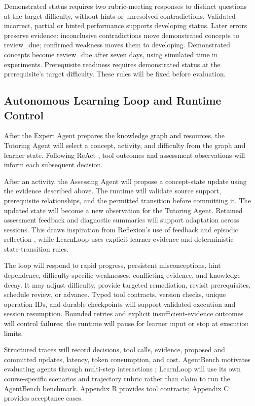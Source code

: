 \documentclass{article}
\begin{document}
Demonstrated status requires two rubric-meeting responses to distinct questions at the target difficulty, without hints or unresolved contradictions. Validated incorrect, partial or hinted performance supports developing status. Later errors preserve evidence: inconclusive contradictions move demonstrated concepts to review\_due; confirmed weakness moves them to developing. Demonstrated concepts become review\_due after seven days, using simulated time in experiments. Prerequisite readiness requires demonstrated status at the prerequisite's target difficulty. These rules will be fixed before evaluation.

\subsection{Autonomous Learning Loop and Runtime Control}

After the Expert Agent prepares the knowledge graph and resources, the Tutoring Agent will select a concept, activity, and difficulty from the graph and learner state. Following ReAct \citep{ref1}, tool outcomes and assessment observations will inform each subsequent decision.

After an activity, the Assessing Agent will propose a concept-state update using the evidence described above. The runtime will validate source support, prerequisite relationships, and the permitted transition before committing it. The updated state will become a new observation for the Tutoring Agent. Retained assessment feedback and diagnostic summaries will support adaptation across sessions. This draws inspiration from Reflexion's use of feedback and episodic reflection \citep{ref6}, while LearnLoop uses explicit learner evidence and deterministic state-transition rules.

The loop will respond to rapid progress, persistent misconceptions, hint dependence, difficulty-specific weaknesses, conflicting evidence, and knowledge decay. It may adjust difficulty, provide targeted remediation, revisit prerequisites, schedule review, or advance. Typed tool contracts, version checks, unique operation IDs, and durable checkpoints will support validated execution and session resumption. Bounded retries and explicit insufficient-evidence outcomes will control failures; the runtime will pause for learner input or stop at execution limits.

Structured traces will record decisions, tool calls, evidence, proposed and committed updates, latency, token consumption, and cost. AgentBench motivates evaluating agents through multi-step interactions \citep{ref7}; LearnLoop will use its own course-specific scenarios and trajectory rubric rather than claim to run the AgentBench benchmark. Appendix B provides tool contracts; Appendix C provides acceptance cases.
\end{document}
